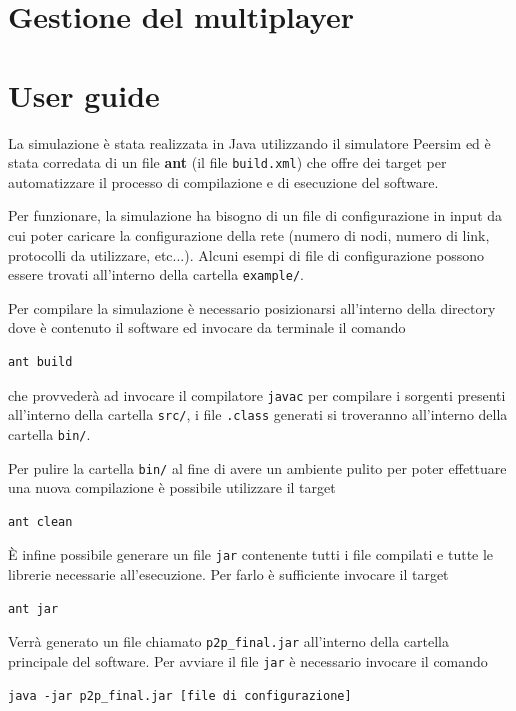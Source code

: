 \documentclass[a4paper,12pt]{article}
\begin{document}
\section{Gestione del multiplayer}
\label{sec:multiplayer}

\section{User guide}
\label{sec:guide}

La simulazione \`e stata realizzata in Java utilizzando il simulatore Peersim ed \`e stata corredata di un file \textbf{ant} (il file \texttt{build.xml}) che offre dei target per automatizzare il processo di compilazione e di esecuzione del software.

Per funzionare, la simulazione ha bisogno di un file di configurazione in input da cui poter caricare la configurazione della rete (numero di nodi, numero di link, protocolli da utilizzare, etc...). Alcuni esempi di file di configurazione possono essere trovati all'interno della cartella \texttt{example/}.

Per compilare la simulazione \`e necessario posizionarsi all'interno della directory dove \`e contenuto il software ed invocare da terminale il comando

\begin{lstlisting}[basicstyle=\ttfamily]
ant build
\end{lstlisting}

che provveder\`a ad invocare il compilatore \texttt{javac} per compilare i sorgenti presenti all'interno della cartella \texttt{src/}, i file \texttt{.class} generati si troveranno all'interno della cartella \texttt{bin/}. 

Per pulire la cartella \texttt{bin/} al fine di avere un ambiente pulito per poter effettuare una nuova compilazione \`e possibile utilizzare il target
\begin{lstlisting}[basicstyle=\ttfamily]
ant clean
\end{lstlisting}

\`E infine possibile generare un file \texttt{jar} contenente tutti i file compilati e tutte le librerie necessarie all'esecuzione. Per farlo \`e sufficiente invocare il target
\begin{lstlisting}[basicstyle=\ttfamily]
ant jar
\end{lstlisting}
Verr\`a generato un file chiamato \texttt{p2p\_final.jar} all'interno della cartella principale del software.
Per avviare il file \texttt{jar} \`e necessario invocare il comando
\begin{lstlisting}[basicstyle=\ttfamily]
java -jar p2p_final.jar [file di configurazione]
\end{lstlisting}
\end{document}
